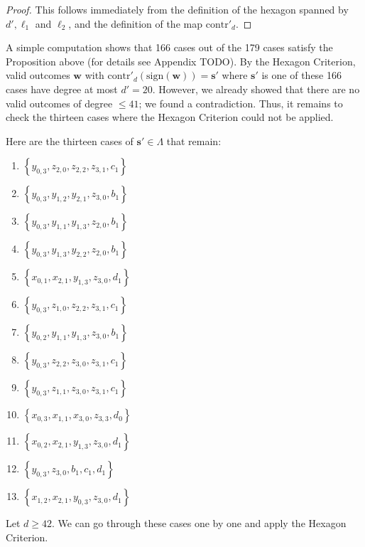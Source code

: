 \begin{proof}
    This follows immediately from the definition of the hexagon spanned by \( d', \ell_1 \) and \( \ell_2 \), and the definition of the map \( \mathrm{contr}'_d \).
\end{proof}

A simple computation shows that 166 cases out of the 179 cases satisfy the Proposition above (for details see Appendix TODO). By the Hexagon Criterion, valid outcomes \( \mathbf{w} \) with \( \mathrm{contr}'_d(\mathrm{sign}(\mathbf{w})) = \mathbf{s}' \) where \( \mathbf{s}' \) is one of these 166 cases have degree at most \( d' = 20 \). However, we already showed that there are no valid outcomes of degree \( \leq 41 \); we found a contradiction. Thus, it remains to check the thirteen cases where the Hexagon Criterion could not be applied.

Here are the thirteen cases of \( \mathbf{s}' \in \Lambda \) that remain:
\begin{enumerate}
    \item \( \left\{ y_{0,3}, z_{2,0}, z_{2,2}, z_{3,1}, c_1 \right\} \)
    \item \( \left\{ y_{0,3}, y_{1,2}, y_{2,1}, z_{3,0}, b_1 \right\} \)
    \item \( \left\{ y_{0,3}, y_{1,1}, y_{1,3}, z_{2,0}, b_1 \right\} \)
    \item \( \left\{ y_{0,3}, y_{1,3}, y_{2,2}, z_{2,0}, b_1 \right\} \)
    \item \( \left\{ x_{0,1}, x_{2,1}, y_{1,3}, z_{3,0}, d_1 \right\} \)
    \item \( \left\{ y_{0,3}, z_{1,0}, z_{2,2}, z_{3,1}, c_1 \right\} \)
    \item \( \left\{ y_{0,2}, y_{1,1}, y_{1,3}, z_{3,0}, b_1 \right\} \)
    \item \( \left\{ y_{0,3}, z_{2,2}, z_{3,0}, z_{3,1}, c_1 \right\} \)
    \item \( \left\{ y_{0,3}, z_{1,1}, z_{3,0}, z_{3,1}, c_1 \right\} \)
    \item \( \left\{ x_{0,3}, x_{1,1}, x_{3,0}, z_{3,3}, d_0 \right\} \)
    \item \( \left\{ x_{0,2}, x_{2,1}, y_{1,3}, z_{3,0}, d_1 \right\} \)
    \item \( \left\{ y_{0,3}, z_{3,0}, b_1, c_1, d_1 \right\} \)
    \item \( \left\{ x_{1,2}, x_{2,1}, y_{0,3}, z_{3,0}, d_1 \right\} \)
\end{enumerate}
Let \( d \geq 42 \). We can go through these cases one by one and apply the Hexagon Criterion.

